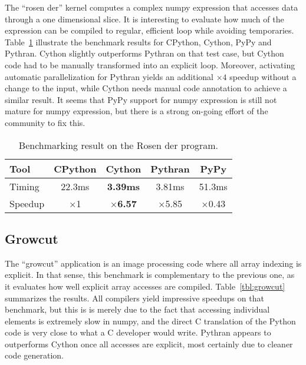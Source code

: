 \documentclass[10pt, onecolumn, preprint]{sigplanconf}
\begin{document}
The ``rosen der'' kernel computes a complex numpy expression that accesses
data through a one dimensional slice. It is interesting to evaluate how much of
the expression can be compiled to regular, efficient loop while avoiding
temporaries.  Table~\ref{tbl:rosen} illustrate the benchmark results for
CPython, Cython, PyPy and Pythran. Cython slightly outperforms Pythran on that
test case, but Cython code had to be manually transformed into an explicit
loop. Moreover, activating automatic parallelization for Pythran yields an
additional $\times4$ speedup without a change to the input, while Cython needs
manual code annotation to achieve a similar result. It seems that PyPy support
for numpy expression is still not mature for numpy expression, but there is a
strong on-going effort of the community to fix this.

\begin{table}
    \centering

    \begin{tabular}{|l|c|c|c|c|}
        \hline
     Tool    &  CPython    &   Cython     &     Pythran   &  PyPy \\
    \hline
    Timing  &  22.3ms   &   \textbf{3.39ms}     &    3.81ms &  51.3ms  \\
    \hline
    Speedup &  $\times$1         &    \textbf{$\times$6.57}      &    $\times$5.85   &  $\times$0.43    \\
    \hline
\end{tabular}
\caption{Benchmarking result on the Rosen der program.}
\label{tbl:rosen}

\end{table}

\subsection{Growcut}

The ``growcut'' application is an image processing code where all array indexing
is explicit. In that sense, this benchmark is complementary to the previous
one, as it evaluates how well explicit array accesses are compiled.
Table~\ref{tbl:growcut} summarizes the results. All compilers yield impressive
speedups on that benchmark, but this is is merely due to the fact that
accessing individual elements is extremely slow in numpy, and the direct C
translation of the Python code is very close to what a C developer would write.
Pythran appears to outperforms Cython once all accesses are explicit, most
certainly due to cleaner code generation.
\end{document}
